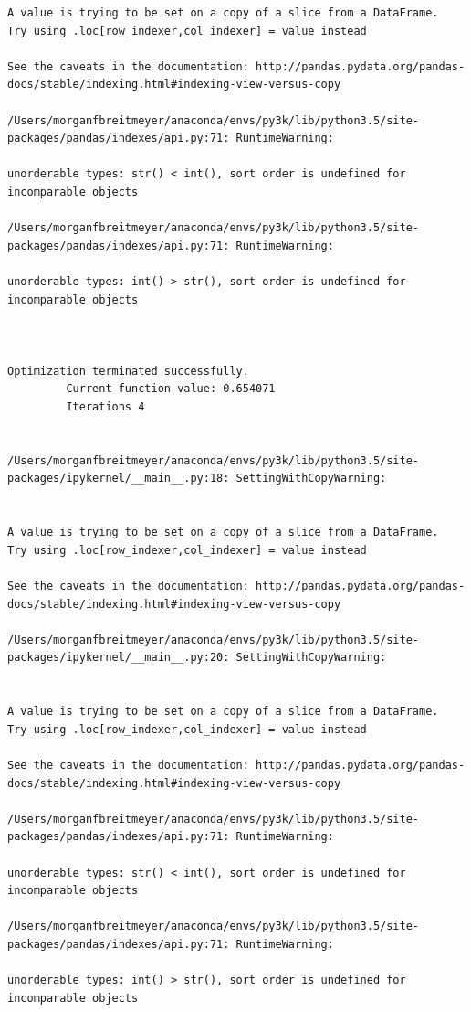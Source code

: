 \begin{lstlisting}
A value is trying to be set on a copy of a slice from a DataFrame.
Try using .loc[row_indexer,col_indexer] = value instead

See the caveats in the documentation: http://pandas.pydata.org/pandas-docs/stable/indexing.html#indexing-view-versus-copy

/Users/morganfbreitmeyer/anaconda/envs/py3k/lib/python3.5/site-packages/pandas/indexes/api.py:71: RuntimeWarning:

unorderable types: str() < int(), sort order is undefined for incomparable objects

/Users/morganfbreitmeyer/anaconda/envs/py3k/lib/python3.5/site-packages/pandas/indexes/api.py:71: RuntimeWarning:

unorderable types: int() > str(), sort order is undefined for incomparable objects



Optimization terminated successfully.
         Current function value: 0.654071
         Iterations 4


/Users/morganfbreitmeyer/anaconda/envs/py3k/lib/python3.5/site-packages/ipykernel/__main__.py:18: SettingWithCopyWarning:


A value is trying to be set on a copy of a slice from a DataFrame.
Try using .loc[row_indexer,col_indexer] = value instead

See the caveats in the documentation: http://pandas.pydata.org/pandas-docs/stable/indexing.html#indexing-view-versus-copy

/Users/morganfbreitmeyer/anaconda/envs/py3k/lib/python3.5/site-packages/ipykernel/__main__.py:20: SettingWithCopyWarning:


A value is trying to be set on a copy of a slice from a DataFrame.
Try using .loc[row_indexer,col_indexer] = value instead

See the caveats in the documentation: http://pandas.pydata.org/pandas-docs/stable/indexing.html#indexing-view-versus-copy

/Users/morganfbreitmeyer/anaconda/envs/py3k/lib/python3.5/site-packages/pandas/indexes/api.py:71: RuntimeWarning:

unorderable types: str() < int(), sort order is undefined for incomparable objects

/Users/morganfbreitmeyer/anaconda/envs/py3k/lib/python3.5/site-packages/pandas/indexes/api.py:71: RuntimeWarning:

unorderable types: int() > str(), sort order is undefined for incomparable objects




\end{lstlisting}
